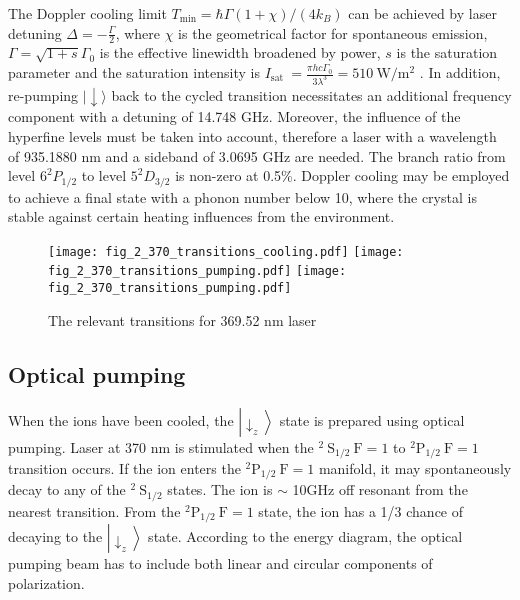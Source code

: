 The Doppler cooling limit $T_{\min }=\hbar \Gamma(1+\chi) /\left(4 k_B\right)$ can be achieved by laser detuning $\Delta=-\frac{\Gamma}{2}$, where $\chi$ is the geometrical factor for spontaneous emission, $\Gamma=\sqrt{1+s} \Gamma_0$ is the effective linewidth broadened by power, $s$ is the saturation parameter and the saturation intensity is $I_{\text {sat }}=\frac{\pi h c \Gamma_0}{3 \lambda^3}=510 \mathrm{~W} / \mathrm{m}^2$ \cite{RN201, RN127}. In addition, re-pumping $|\downarrow\rangle$ back to the cycled transition necessitates an additional frequency component with a detuning of 14.748 GHz. Moreover, the influence of the hyperfine levels must be taken into account, therefore a laser with a wavelength of 935.1880 nm and a sideband of 3.0695 GHz are needed. The branch ratio from level $6^2 P_{1 / 2}$ to level $5^2 D_{3 / 2}$ is non-zero at 0.5\%. Doppler cooling may be employed to achieve a final state with a phonon number below 10, where the crystal is stable against certain heating influences from the environment.

\begin{figure}
    \centering
    {\texttt{[image: fig\_2\_370\_transitions\_cooling.pdf]}}
    {\texttt{[image: fig\_2\_370\_transitions\_pumping.pdf]}}
    {\texttt{[image: fig\_2\_370\_transitions\_pumping.pdf]}}
    \caption{The relevant transitions for 369.52 nm laser}
    \label{fig:370_transitions}
\end{figure}

\subsection{Optical pumping}

When the ions have been cooled, the $\left|\downarrow_z\right\rangle$ state is prepared using optical pumping. Laser at 370 nm is stimulated when the ${ }^2 \mathrm{~S}_{1 / 2} \mathrm{~F}=1$ to ${ }^2 \mathrm{P}_{1 / 2} \mathrm{~F}=1$ transition occurs. If the ion enters the ${ }^2 \mathrm{P}_{1 / 2} \mathrm{~F}=1$ manifold, it may spontaneously decay to any of the ${ }^2 \mathrm{~S}_{1 / 2}$ states. The ion is $\sim$ 10GHz off resonant from the nearest transition. From the ${ }^2 \mathrm{P}_{1 / 2} \mathrm{~F}=1$ state, the ion has a 1/3 chance of decaying to the $\left|\downarrow_z\right\rangle$ state. According to the energy diagram, the optical pumping beam has to include both linear and circular components of polarization.

